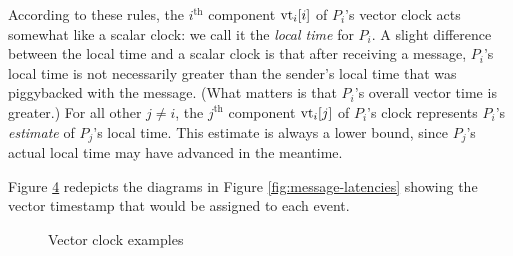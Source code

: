 \documentclass[]             %
{NASA}                       %
\theoremstyle{definition}
\begin{document}
According to these rules, the $i^\textrm{th}$ component $\textrm{vt}_i[i]$ of
$P_i$'s vector clock acts somewhat like a scalar clock: we call it the
\emph{local time} for $P_i$. A slight difference between the local
time and a scalar clock is that after receiving a message, $P_i$'s
local time is not necessarily greater than the sender's local time
that was piggybacked with the message. (What matters is that $P_i$'s
overall vector time is greater.) For all other $j \neq i$, the
$j^\textrm{th}$ component $\textrm{vt}_i[j]$ of $P_i$'s clock represents
$P_i$'s \emph{estimate} of $P_j$'s local time. This estimate is always
a lower bound, since $P_j$'s actual local time may have advanced in
the meantime.

Figure \ref{fig:message-latencies-vector} redepicts the diagrams in
Figure \ref{fig:message-latencies} showing the vector timestamp that
would be assigned to each event.

\begin{figure}[p]
  \setlength\belowcaptionskip{5ex}

  \begin{subfigure}{1\textwidth}
    \centering
    
    \label{fig:message-latencies-vector-a}
  \end{subfigure}

  \vspace{4ex}

  \begin{subfigure}{1\textwidth}
    \centering 
    \label{fig:message-latencies-vector-b}
  \end{subfigure}

  \begin{subfigure}{1\textwidth}
    \centering 
    \label{fig:message-latencies-vector-c}
  \end{subfigure}

  \caption{Vector clock examples}
  \label{fig:message-latencies-vector}
\end{figure}

\afterpage{\clearpage}
\end{document}
